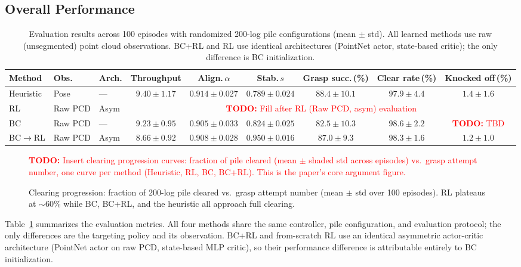 \documentclass[conference]{IEEEtran}
\newcommand{\TODO}[1]{\textcolor{red}{\textbf{TODO:} #1}}
\begin{document}
\subsection{Overall Performance}
\begin{table}[t]
\centering
\caption{Evaluation results across 100 episodes with randomized 200-log pile configurations (mean $\pm$ std). All learned methods use raw (unsegmented) point cloud observations. BC+RL and RL use identical architectures (PointNet actor, state-based critic); the only difference is BC initialization.}
\label{tab:results}
\setlength{\tabcolsep}{5pt}
\begin{tabular}{@{}lllcccccc@{}}
\toprule
Method & Obs. & Arch. & Throughput & Align.\,$\alpha$ & Stab.\,$s$ & Grasp succ.\,(\%) & Clear rate\,(\%) & Knocked off\,(\%) \\
\midrule
Heuristic & Pose & --- & $9.40 \pm 1.17$ & $0.914 \pm 0.027$ & $0.789 \pm 0.024$ & $88.4 \pm 10.1$ & $97.9 \pm 4.4$ & $1.4 \pm 1.6$ \\
\addlinespace
RL        & Raw PCD & Asym & \multicolumn{6}{c}{\TODO{Fill after RL (Raw PCD, asym) evaluation}} \\
\addlinespace
BC        & Raw PCD & --- & $9.23 \pm 0.95$ & $0.905 \pm 0.033$ & $0.824 \pm 0.025$ & $82.5 \pm 10.3$ & $98.6 \pm 2.2$ & \TODO{TBD} \\
\addlinespace
BC$\to$RL & Raw PCD & Asym & $8.66 \pm 0.92$ & $0.908 \pm 0.028$ & $\mathbf{0.950 \pm 0.016}$ & $\mathbf{87.0 \pm 9.3}$ & $98.3 \pm 1.6$ & $1.2 \pm 1.0$ \\
\bottomrule
\end{tabular}
\end{table}

\begin{figure}[t]
\centering
\TODO{Insert clearing progression curves: fraction of pile cleared (mean $\pm$ shaded std across episodes) vs.\ grasp attempt number, one curve per method (Heuristic, RL, BC, BC+RL). This is the paper's core argument figure.}
\caption{Clearing progression: fraction of 200-log pile cleared vs.\ grasp attempt number (mean $\pm$ std over 100 episodes). RL plateaus at $\sim$60\% while BC, BC+RL, and the heuristic all approach full clearing.}
\label{fig:clearing_curves}
\end{figure}

Table~\ref{tab:results} summarizes the evaluation metrics.
All four methods share the same controller, pile configuration, and evaluation protocol; the only differences are the targeting policy and its observation.
BC+RL and from-scratch RL use an identical asymmetric actor-critic architecture (PointNet actor on raw PCD, state-based MLP critic), so their performance difference is attributable entirely to BC initialization.
\end{document}
